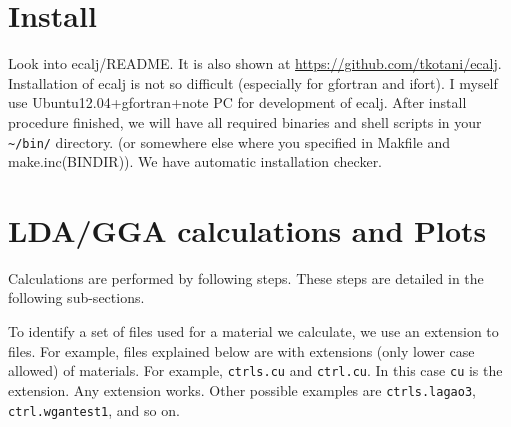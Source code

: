 \documentclass[a4paper,10pt,epsf,fleqn]{article}
\begin{document}




\section{Install}
\label{install}
Look into ecalj/README. It is also shown at \url{https://github.com/tkotani/ecalj}.
Installation of ecalj is not so difficult (especially for gfortran and ifort). 
I myself use Ubuntu12.04+gfortran+note PC for development of ecalj.
After install procedure finished, we will have all required binaries and
shell scripts in your \verb+~/bin/+ directory. 
(or somewhere else where you specified in Makfile and make.inc(BINDIR)).
We have automatic installation checker.


\section{LDA/GGA calculations and Plots}
Calculations are performed by following steps. 
These steps are detailed in the following sub-sections. 

To identify a set of files used for a material we calculate, we use 
an extension to files. For example, files explained below are
with extensions (only lower case allowed) of materials.
For example, \verb+ctrls.cu+ and \verb+ctrl.cu+. In this case
\verb+cu+ is the extension. Any extension works. Other possible examples are
\verb+ctrls.lagao3+, \verb+ctrl.wgantest1+, and so on.
\end{document}
